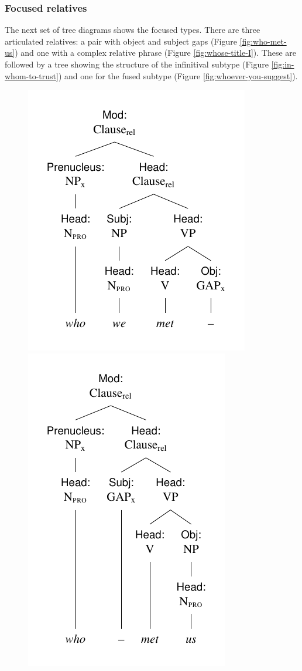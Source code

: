 \newpage
\subsubsection*{Focused relatives}

The next set of tree diagrams shows the focused types. There are three articulated relatives: a pair with object and subject gaps (Figure \ref{fig:who-met-us}) and one with a complex relative phrase (Figure \ref{fig:whose-title-I}). These are followed by a tree showing the structure of the infinitival subtype (Figure \ref{fig:in-whom-to-trust}) and one for the fused subtype (Figure \ref{fig:whoever-you-suggest}).

\begin{figure}[ht]
    \includegraphics{figures/who-we-met.pdf}
    \includegraphics{figures/who-met-us.pdf}

\end{figure}

